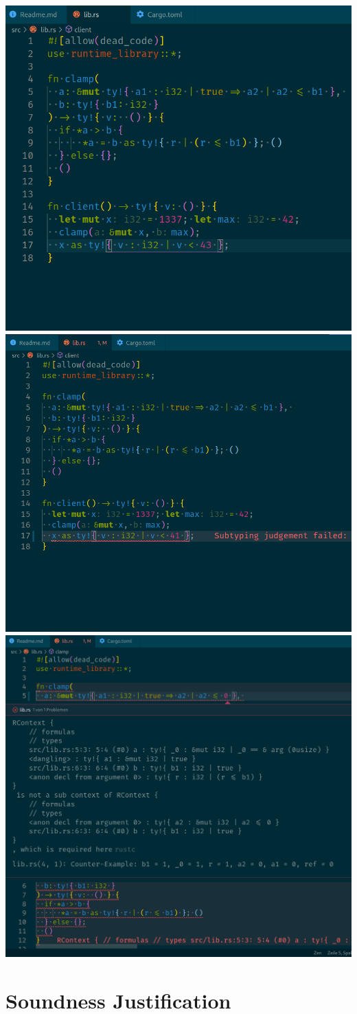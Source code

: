 \documentclass{sdqbeamer}
\begin{document}
\begin{frame}
  \centering
   { \includegraphics[width=.5\textwidth]{../demo-1.png} }
   { \includegraphics[width=.5\textwidth]{../demo-2.png} }
   { \includegraphics[width=.5\textwidth]{../demo-3.png} }
\end{frame}

\section{Soundness Justification}
\end{document}
